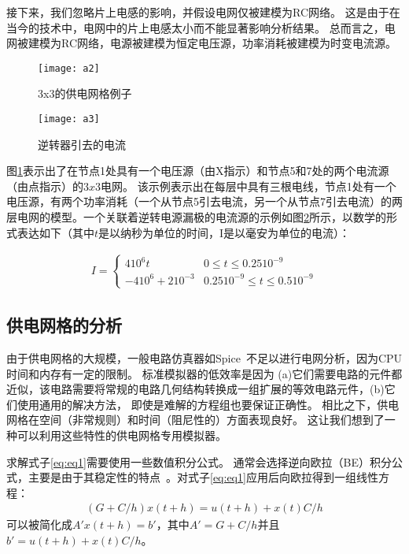 接下来，我们忽略片上电感的影响，并假设电网仅被建模为RC网络。 这是由于在当今的技术中，电网中的片上电感太小而不能显著影响分析结果。 总而言之，电网被建模为RC网络，电源被建模为恒定电压源，功率消耗被建模为时变电流源。

\begin{figure}[H] %
  \centering
  \texttt{[image: a2]}
  \caption{3x3的供电网格例子}
  \label{fig:a2}
\end{figure}

\begin{figure}[H] %
  \centering
  \texttt{[image: a3]}
  \caption{逆转器引去的电流}
  \label{fig:a3}
\end{figure}

图\ref{fig:a2}表示出了在节点1处具有一个电压源（由X指示）和节点5和7处的两个电流源（由点指示）的$3x3$电网。 该示例表示出在每层中具有三根电线，节点1处有一个电压源，有两个功率消耗（一个从节点5引去电流，另一个从节点7引去电流）的两层电网的模型。一个关联着逆转电源漏极的电流源的示例如图\ref{fig:a3}所示，以数学的形式表达如下（其中$t$是以纳秒为单位的时间，I是以毫安为单位的电流）：

\begin{align}
I=\begin{cases}
    410^6t & 0\leq t \leq 0.2510^{-9}\\
    -410^6 + 210^{-3} & 0.2510^{-9} \leq t \leq 0.510^{-9}
\end{cases}
\end{align}

\subsection{供电网格的分析}

由于供电网格的大规模，一般电路仿真器如Spice~\cite{nagel1975spice2}不足以进行电网分析，因为CPU时间和内存有一定的限制。 标准模拟器的低效率是因为 (a)它们需要电路的元件都近似，该电路需要将常规的电路几何结构转换成一组扩展的等效电路元件，(b)它们使用通用的解决方法， 即使是难解的方程组也要保证正确性。 相比之下，供电网格在空间（非常规则）和时间（阻尼性的）方面表现良好。 这让我们想到了一种可以利用这些特性的供电网格专用模拟器。

求解式子\ref{eq:eq1}需要使用一些数值积分公式。 通常会选择逆向欧拉（BE）积分公式，主要是由于其稳定性的特点~\cite{pillage1998electronic}。对式子\ref{eq:eq1}应用后向欧拉得到一组线性方程：
\begin{align}
(G+C/h)x(t+h)=u(t+h)+x(t)C/h
\label{eq:eq2}
\end{align}
可以被简化成$A'x(t+h)=b'$，其中$A'=G+C/h$并且$b'=u(t+h)+x(t)C/h$。


